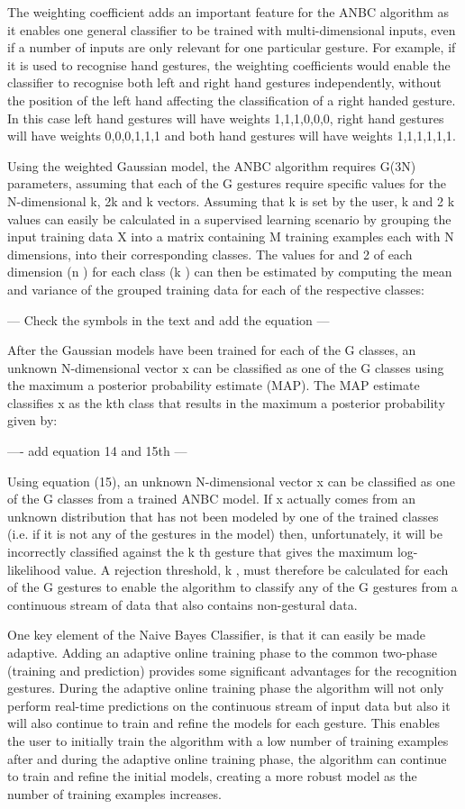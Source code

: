 The weighting coefficient adds an important feature for the ANBC algorithm as it enables one general classifier to be trained with multi-dimensional inputs, even if a number of inputs are only relevant for one particular gesture. For example, if it is used to recognise hand gestures, the weighting coefficients would enable the classifier to recognise both left and right hand gestures independently, without the position of the left hand affecting the classification of a right handed gesture. In this case left hand gestures will have weights {1,1,1,0,0,0}, right hand gestures will have weights {0,0,0,1,1,1} and both hand gestures will have weights {1,1,1,1,1,1}.

Using the weighted Gaussian model, the ANBC algorithm requires G(3N) parameters, assuming that each of the G gestures require specific values for the N-dimensional k, 2k and k vectors. Assuming that k is set by the user, k and 2 k  values can easily be calculated in a supervised learning scenario by grouping the input training data X into a matrix containing M training examples each with N dimensions, into their corresponding classes. The values for   and 2  of each dimension (n ) for each class (k ) can then be estimated by computing the mean and variance of the grouped training data for each of the respective classes:


--- Check the symbols in the text and add the equation ---


After the Gaussian models have been trained for each of the G classes, an unknown N-dimensional vector x can be classified as one of the G classes using the maximum a posterior probability estimate (MAP). The MAP estimate classifies x as the kth class that results in the maximum a posterior probability given by:


---- add equation 14 and 15th ---

Using equation (15), an unknown N-dimensional vector x can be classified as one of the G classes from a trained ANBC model. If x actually comes from an unknown distribution that has not been modeled by one of the trained classes (i.e. if it is not any of the gestures in the model) then, unfortunately, it will be incorrectly classified against the k th gesture that gives the maximum log-likelihood value. A rejection threshold, k , must therefore be calculated for each of the G gestures to enable the algorithm to classify any of the G gestures from a continuous stream of data that also contains non-gestural data.

One key element of the Naive Bayes Classifier, is that it can easily be made adaptive. Adding an adaptive online training phase to the common two-phase (training and prediction) provides some significant advantages for the recognition gestures. During the adaptive online training phase the algorithm will not only perform real-time predictions on the continuous stream of input data but also it will also continue to train and refine the models for each gesture. This enables the user to initially train the algorithm with a low number of training examples after and during the adaptive online training phase, the algorithm can continue to train and refine the initial models, creating a more robust model as the number of training examples increases.

